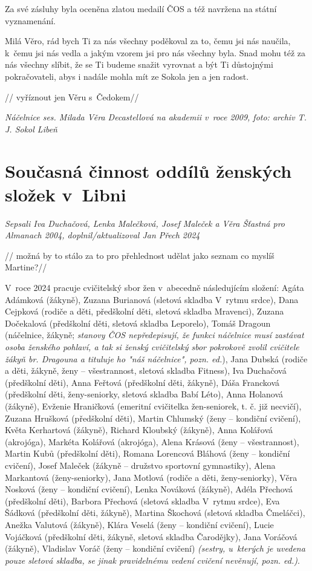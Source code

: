 \documentclass[a5paper, 12pt, twoside]{article}
\begin{document}
Za své zásluhy byla oceněna zlatou medailí ČOS a též navržena na státní
vyznamenání.

Milá Věro, rád bych Ti za nás všechny poděkoval za to, čemu jsi nás
naučila, k~čemu jsi nás vedla a jakým vzorem jsi pro nás všechny byla.
Snad mohu též za nás všechny slíbit, že se Ti budeme snažit vyrovnat a
být Ti důstojnými pokračovateli, abys i nadále mohla mít ze Sokola jen a
jen radost.


// vyříznout jen Věru s~Čedokem//

\textit{Náčelnice ses. Milada Věra Decastellová na akademii v~roce 2009,
foto: archiv T. J. Sokol Libeň}

\section{Současná činnost oddílů ženských složek
v~Libni}

\textit{Sepsali Iva Duchačová, Lenka Malečková, Josef Maleček a Věra
Šťastná pro Almanach 2004, doplnil/aktualizoval Jan Přech 2024}

// možná by to stálo za to pro přehlednost udělat jako seznam co myslíš
Martine?//

V~roce 2024 pracuje cvičitelský sbor žen v~abecedně následujícím
složení: Agáta Adámková (žákyně), Zuzana Burianová (sletová skladba
V~rytmu srdce), Dana Cejpková (rodiče a děti, předškolní děti, sletová
skladba Mravenci), Zuzana Dočekalová (předškolní děti, sletová skladba
Leporelo), Tomáš Dragoun (náčelnice, žákyně; \textit{stanovy ČOS
nepředepisují, že funkci náčelnice musí zastávat osoba ženského pohlaví,
a tak si ženský cvičitelský sbor pokrokově zvolil cvičitele žákyň br.
Dragouna a tituluje ho "náš náčelnice", pozn. ed.}), Jana Dubská
(rodiče a děti, žákyně, ženy -- všestrannost, sletová skladba Fitness),
Iva Duchačová (předškolní děti), Anna Feřtová (předškolní děti, žákyně),
Dáša Francková (předškolní děti, ženy-seniorky, sletová skladba Babí
Léto), Anna Holanová (žákyně), Evženie Hraničková (emeritní cvičitelka
žen-seniorek, t. č. již necvičí), Zuzana Hrušková (předškolní děti),
Martin Chlumský (ženy -- kondiční cvičení), Květa Kerhartová
(žákyně), Richard Kloubský (žákyně), Anna Kolářová (akrojóga), Markéta
Kolářová (akrojóga), Alena Krásová (ženy -- všestrannost), Martin Kubů
(předškolní děti), Romana Lorencová Bláhová (ženy -- kondiční cvičení),
Josef Maleček (žákyně -- družstvo sportovní gymnastiky), Alena
Markantová (ženy-seniorky), Jana Motlová (rodiče a děti,
ženy-seniorky), Věra Nosková (ženy -- kondiční cvičení), Lenka Nováková
(žákyně), Adéla Přechová (předškolní děti), Barbora Přechová (sletová
skladba V~rytmu srdce), Eva Šádková (předškolní děti, žákyně), Martina
Škochová (sletová skladba Čmeláčci), Anežka Valutová (žákyně), Klára
Veselá (ženy -- kondiční cvičení), Lucie Vojáčková (předškolní děti,
žákyně, sletová skladba Čarodějky), Jana Voráčová (žákyně), Vladislav
Voráč (ženy -- kondiční cvičení) \textit{(sestry, u~kterých je uvedena
pouze sletová skladba, se jinak pravidelnému vedení cvičení nevěnují,
pozn. ed.)}.
\end{document}
